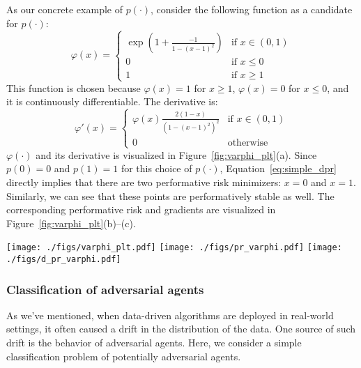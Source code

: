 As our concrete example of $p(\cdot)$, consider the following function as a candidate for $p(\cdot)$:
\begin{equation}
\label{eq:varphi_def}
\varphi(x) = 
\begin{cases}
\exp\left( 1 + \frac{-1}{1-(x-1)^2} \right) & \text{if } x \in (0,1) \\
0 & \text{if } x \le 0 \\
1 & \text{if } x \ge 1
\end{cases}
\end{equation}
This function is chosen because $\varphi(x) = 1$ for $x \ge 1$, $\varphi(x) = 0$ for $x \le 0$, and it is continuously differentiable. The derivative is:
\begin{equation}
\label{eq:dvarphi_def}
\varphi'(x) = 
\begin{cases}
\varphi(x) \frac{2(1-x)}{(1-(x-1)^2)^2} & \text{if } x \in (0,1) \\
0 & \text{otherwise}
\end{cases}
\end{equation}
$\varphi(\cdot)$ and its derivative is visualized in Figure~\ref{fig:varphi_plt}(a).  Since $p(0) = 0$ and $p(1) = 1$ for this choice of $p(\cdot)$, Equation~\eqref{eq:simple_dpr} directly implies that there are two performative risk minimizers: $x = 0$ and $x = 1$. Similarly, we can see that these points are performatively stable as well. 
The corresponding performative risk and gradients are visualized in Figure~\ref{fig:varphi_plt}(b)--(c).



\begin{figure*}[t!]
  \centering
\texttt{[image: ./figs/varphi\_plt.pdf]}
\texttt{[image: ./figs/pr\_varphi.pdf]}
\texttt{[image: ./figs/d\_pr\_varphi.pdf]}
  \caption{As an illustrative example, we consider a setting where with the squared error is used as the loss function, and the decision-dependent distribution shift modifies the parameters of a Bernoulli distribution, as discussed in Section~\ref{sec:simple_ex}. (a) A visualization of an example decision-dependent distribution shift $\varphi(x)$, as defined in Equation~\eqref{eq:varphi_def}, and its derivative, as derived in Equation~\eqref{eq:dvarphi_def}.  (b) The performative risk with $\Pr(Z = 1) = p(x) = \varphi(x)$. (c) The corresponding gradients for $p(x) = \varphi(x)$.}
  \label{fig:varphi_plt}
\end{figure*}

\subsubsection{Classification of adversarial agents}
\label{sec:adv_class}
As we've mentioned, when data-driven algorithms are deployed in real-world settings, it often caused a drift in the distribution of the data. One source of such drift is the behavior of adversarial agents. Here, we consider a simple classification problem of potentially adversarial agents.

